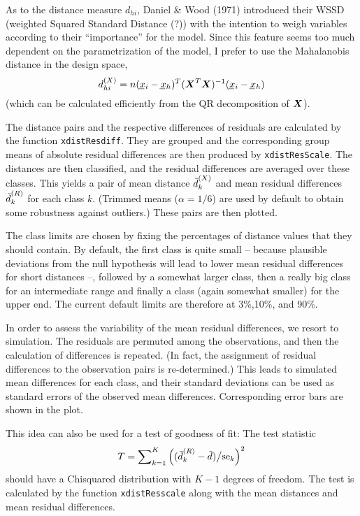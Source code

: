 \documentclass{article}
\providecommand{\vc}[1]{\kern-1pt\underline{\kern1pt#1\kern-1pt}\kern1pt}
\providecommand{\bmath}[1]{\relax\ifmmode{\mbox{\boldmath $#1$}}%
  \else{\boldmath $#1$}\fi}
\providecommand{\mx}[1]{\bmath#1}
\providecommand{\sups}[1]{^{(#1)}}
\providecommand{\wb}[1]{{}\if Y#1\overline{Y}\else
\kern0.2em\overline{\kern-0.2em#1}\fi}
\providecommand{\code}[1]{\texttt{#1}}
\begin{document}
As to the distance measure $d_{hi}$, %
Daniel \& Wood (1971) introduced their 
WSSD (weighted Squared Standard Distance (?))
with the intention to weigh variables according to their ``importance'' for
the model. Since this feature seems too much dependent on the
parametrization of the model, I prefer to use the Mahalanobis distance in
the design space, 
$$
  d\sups X_{hi} = n(\vc x_i-\vc x_h)^T (\mx X^T\mx X)^{-1} (\vc x_i-\vc x_h)
$$
(which can be calculated efficiently from the QR decomposition of $\mx X$).

The distance pairs and the respective differences of residuals are
calculated by the function \code{xdistResdiff}. They are grouped and the
corresponding group means of absolute residual differences are then
produced by \code{xdistResScale}. 
The distances are then classified, and the residual differences
are averaged over these classes. This yields a pair of mean distance 
$\wb d\sups X_k$ and mean residual differences $\wb d\sups R_k$ 
for each class $k$. 
(Trimmed means ($\alpha=1/6$) are used by default to obtain some
robustness against outliers.)
These pairs are then plotted.

The class limits are chosen by fixing the percentages of distance values
that they should contain. By default, the first class is quite small -- 
because plausible deviations from the null hypothesis will lead to lower
mean residual differences for short distances --, followed by a somewhat
larger class, then a really big class for an intermediate range and finally
a class (again somewhat smaller) for the upper end. 
The current default limits are therefore at 3\%,10\%, and 90\%. 

In order to assess the variability of the mean residual differences,
we resort to simulation. The residuals are permuted among the observations,
and then the calculation of differences is repeated.
(In fact, the assignment of residual differences to the observation pairs 
is re-determined.) This leads to simulated mean differences for each class,
and their standard deviations can be used as standard errors of the 
observed mean differences. Corresponding error bars are shown in the
plot. 

This idea can also be used for a test of goodness of fit: The test
statistic 
$$
  T = \sum\nolimits_{k=1}^K \left((\wb d\sups R_k-\wb d)\big/\mbox{se}_k\right)^2
$$
should have a Chisquared distribution with $K-1$ degrees of freedom.
The test is calculated by the function \texttt{xdistResscale} along with
the mean distances and mean residual differences.
\end{document}
